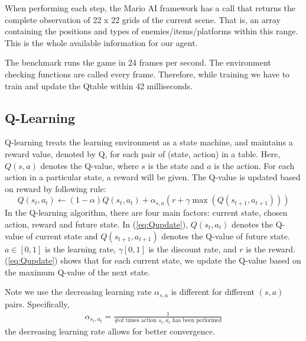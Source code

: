 When performing each step, the Mario AI framework has a call that returns the complete observation of 22 x 22 grids of the current scene. That is, an array containing the positions and types of enemies/items/platforms within this range. This is the whole available information for our agent.

The benchmark runs the game in 24 frames per second. The environment checking functions are called every frame. Therefore, while training we have to train and update the Qtable within 42 milliseconds.

\subsection{Q-Learning}
Q-learning treats the learning environment as a state machine, and maintains a reward value, denoted by Q, for each pair of (state, action) in a table. Here, $Q(s,a)$ denotes the Q-value, where $s$ is the state and $a$ is the action. For each action in a particular state, a reward will be given. The Q-value is updated based on reward by following rule:
\begin{equation}
\label{eq:Qupdate}
Q(s_t,a_t) \leftarrow (1-\alpha)Q(s_t,a_t) + \alpha_{s, a}(r+\gamma\max(Q(s_{t+1},a_{t+1})))
\end{equation}
In the Q-learning algorithm, there are four main factors: current state, chosen action, reward and future state. In (\ref{eq:Qupdate}), $Q(s_t,a_t)$ denotes the Q-value of current state and $Q(s_{t+1},a_{t+1})$ denotes the Q-value of future state. $a \in \left[0,1\right]$ is the learning rate, $\gamma \left[0,1\right]$ is the discount rate, and $r$ is the reward. (\ref{eq:Qupdate}) shows that for each current state, we update the Q-value based on the maximum Q-value of the next state.

Note we use the decreasing learning rate $\alpha_{s, a}$ \cite{??} is different for different $(s,a)$ pairs. Specifically, 
\begin{align*}
\alpha_{s_t, a_t} = \frac{1}{\text{\# of times action $s_t, a_t$ has been performed}}
\end{align*}
the decreasing learning rate allows for better convergence.


